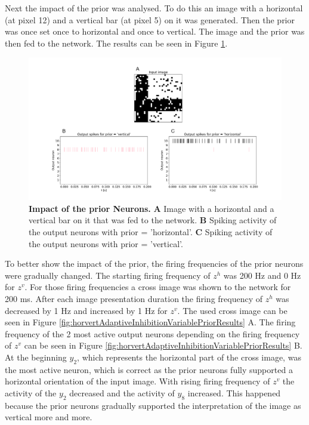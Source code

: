 Next the impact of the prior was analysed. To do this an image with a horizontal (at pixel 12) and a vertical bar (at pixel 5) on it was generated. Then the prior was once set once to horizontal and once to vertical. The image and the prior was then fed to the network. The results can be seen in Figure \ref{fig:horvertAdaptiveInhibitionPriorValResults}.

\begin{figure}
  \includegraphics[width=\linewidth]{figures/horvertAdaptiveInh/20priors_pos5and12/crossValidation.png}
  \caption{\textbf{Impact of the prior Neurons.} \textbf{A} Image with a horizontal and a vertical bar on it that was fed to the network. \textbf{B} Spiking activity of the output neurons with prior = 'horizontal'. \textbf{C} Spiking activity of the output neurons with prior = 'vertical'. }
  \label{fig:horvertAdaptiveInhibitionPriorValResults}
\end{figure}

To better show the impact of the prior, the firing frequencies of the prior neurons were gradually changed. The starting firing frequency of $z^h$ was 200 Hz and 0 Hz for $z^v$. For those firing frequencies a cross image was shown to the network for 200 ms. After each image presentation duration the firing frequency of $z^h$ was decreased by 1 Hz and increased by 1 Hz for $z^v$. The used cross image can be seen in Figure \ref{fig:horvertAdaptiveInhibitionVariablePriorResults} A. The firing frequency of the 2 most active output neurons depending on the firing frequency of $z^v$ can be seen in Figure \ref{fig:horvertAdaptiveInhibitionVariablePriorResults} B. At the beginning $y_2$, which represents the horizontal part of the cross image, was the most active neuron, which is correct as the prior neurons fully supported a horizontal orientation of the input image. With rising firing frequency of $z^v$ the activity of the $y_2$ decreased and the activity of $y_8$ increased. This happened because the prior neurons gradually supported the interpretation of the image as vertical more and more.

